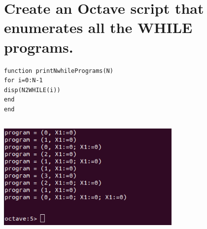 \documentclass[fleqn, 10pt]{article}
\theoremstyle{plain}
\theoremstyle{definition}
\begin{document}
\begin{center}
\end{center}

\newpage
\section {Create an Octave script that enumerates all the WHILE programs.}
\begin{verbatim}
function printNwhilePrograms(N)
for i=0:N-1
disp(N2WHILE(i))
end
end

\end{verbatim}
\begin{center}
\includegraphics[width=9cm, height=6cm]{ejercicio3p4.png}
\end{center}
\end{document}
